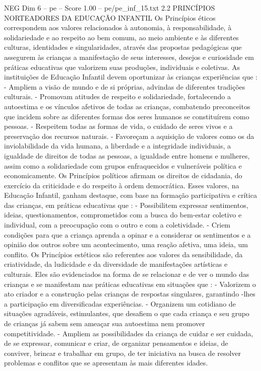 \begin{textsample}{NEG Dim 6 – pe – Score 1.00 – pe/pe\_inf\_15.txt}  \label{ex:f6_neg_034}
2.2 PRINCÍPIOS NORTEADORES DA EDUCAÇÃO INFANTIL Os Princípios éticos correspondem aos valores relacionados à autonomia, à responsabilidade, à solidariedade e ao respeito ao bem comum, ao meio ambiente e às diferentes culturas, identidades e singularidades, através das propostas pedagógicas que assegurem às crianças a manifestação de seus interesses, desejos e curiosidade em práticas educativas que valorizem suas produções, individuais e coletivas.
As instituições de Educação Infantil devem oportunizar às crianças experiências que : - Ampliem a visão de mundo e de si próprias, advindas de diferentes tradições culturais. - Promovam atitudes de respeito e solidariedade, fortalecendo a autoestima e os vínculos afetivos de todas as crianças, combatendo preconceitos que incidem sobre as diferentes formas dos seres humanos se constituírem como pessoas. - Respeitem todas as formas de vida, o cuidado de seres vivos e a preservação dos recursos naturais. - Favoreçam a aquisição de valores como os da inviolabilidade da vida humana, a liberdade e a integridade individuais, a igualdade de direitos de todas as pessoas, a igualdade entre homens e mulheres, assim como a solidariedade com grupos enfraquecidos e vulneráveis política e economicamente.
Os Princípios políticos afirmam os direitos de cidadania, do exercício da criticidade e do respeito à ordem democrática.
Esses valores, na Educação Infantil, ganham destaque, com base na formação participativa e crítica das crianças, em práticas educativas que : - Possibilitem expressar sentimentos, ideias, questionamentos, comprometidos com a busca do bem-estar coletivo e individual, com a preocupação com o outro e com a coletividade. - Criem condições para que a criança aprenda a opinar e a considerar os sentimentos e a opinião dos outros sobre um acontecimento, uma reação afetiva, uma ideia, um conflito.
Os Princípios estéticos são referentes aos valores da sensibilidade, da criatividade, da ludicidade e da diversidade de manifestações artísticas e culturais.
Eles são evidenciados na forma de se relacionar e de ver o mundo das crianças e se manifestam nas práticas educativas em situações que : - Valorizem o ato criador e a construção pelas crianças de respostas singulares, garantindo -lhes a participação em diversificadas experiências. - Organizem um cotidiano de situações agradáveis, estimulantes, que desafiem o que cada criança e seu grupo de crianças já sabem sem ameaçar sua autoestima nem promover competitividade. - Ampliem as possibilidades da criança de cuidar e ser cuidada, de se expressar, comunicar e criar, de organizar pensamentos e ideias, de conviver, brincar e trabalhar em grupo, de ter iniciativa na busca de resolver problemas e conflitos que se apresentam às mais diferentes idades.

\end{textsample}
